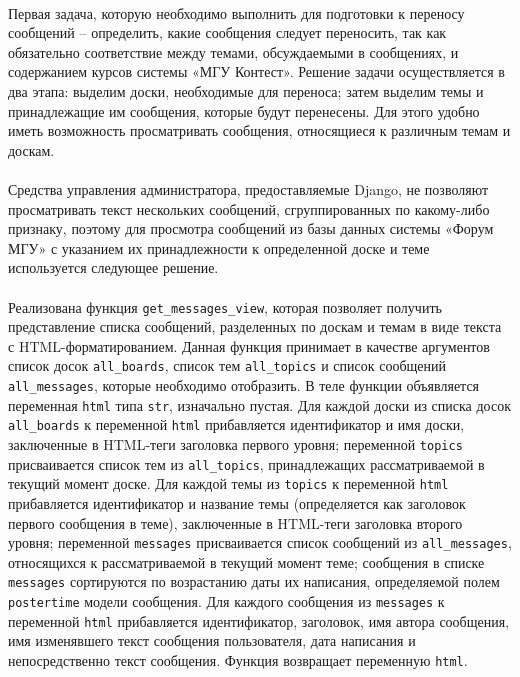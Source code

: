 \documentclass[12pt, a4paper, oneside]{article}
\begin{document}
\paragraph{}
Первая задача, которую необходимо выполнить для подготовки к переносу сообщений – определить, какие сообщения следует переносить, так как обязательно соответствие между темами, обсуждаемыми в сообщениях, и содержанием курсов системы «МГУ Контест». Решение задачи осуществляется в два этапа: выделим доски, необходимые для переноса; затем выделим темы и принадлежащие им сообщения, которые будут перенесены. Для этого удобно иметь возможность просматривать сообщения, относящиеся к различным темам и доскам.
\paragraph{}
Средства управления администратора, предоставляемые Django, не позволяют просматривать текст нескольких сообщений, сгруппированных по какому-либо признаку, поэтому для просмотра сообщений из базы данных системы «Форум МГУ» с указанием их принадлежности к определенной доске и теме используется следующее решение.
\paragraph{}
Реализована функция \texttt{get\_messages\_view}, которая позволяет получить представление списка сообщений, разделенных по доскам и темам в виде текста с HTML-форматированием. Данная функция принимает в качестве аргументов список досок \texttt{all\_boards}, список тем \texttt{all\_topics} и список сообщений \texttt{all\_messages}, которые необходимо отобразить. В теле функции объявляется переменная \texttt{html} типа \texttt{str}, изначально пустая. Для каждой доски из списка досок \texttt{all\_boards} к переменной \texttt{html} прибавляется идентификатор и имя доски, заключенные в HTML-теги заголовка первого уровня; переменной \texttt{topics} присваивается список тем из \texttt{all\_topics}, принадлежащих рассматриваемой в текущий момент доске. Для каждой темы из \texttt{topics} к переменной \texttt{html} прибавляется идентификатор и название темы (определяется как заголовок первого сообщения в теме), заключенные в HTML-теги заголовка второго уровня; переменной \texttt{messages} присваивается список сообщений из \texttt{all\_messages}, относящихся к рассматриваемой в текущий момент теме; сообщения в списке \texttt{messages} сортируются по возрастанию даты их написания, определяемой полем \texttt{postertime} модели сообщения. Для каждого сообщения из \texttt{messages} к переменной \texttt{html} прибавляется идентификатор, заголовок, имя автора сообщения, имя изменявшего текст сообщения пользователя, дата написания и непосредственно текст сообщения. Функция возвращает переменную \texttt{html}.
\end{document}
